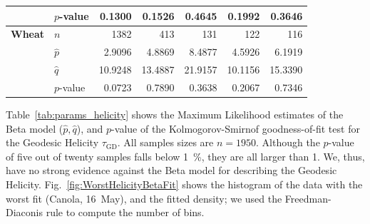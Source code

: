 \documentclass[journal]{IEEEtran}
\begin{document}
\begin{table}[hbt]
\begin{tabular}{clrrrrr}
			& $p$-value 	& 0.1300 	& 0.1526 	& 0.4645 	& 0.1992 	& 0.3646\\
			\midrule
			\textbf{Wheat} 	& $n$ 			& 1382 		& 413 		& 131 		& 122 		& 116\\
			& $\widehat{p}$ & 2.9096  	& 4.8869 	& 8.4877 	& 4.5926 	& 6.1919\\
			& $\widehat{q}$ & 10.9248 	& 13.4887 	& 21.9157 	& 10.1156 	& 15.3390\\
			& $p$-value 	& 0.0723 	& 0.7890 	& 0.3638 	& 0.2067 	& 0.7346\\	
			\bottomrule
		\end{tabular}
	\end{table}
	
	Table~\ref{tab:params_helicity} shows the Maximum Likelihood estimates of the Beta model ($\widehat p,\widehat q$), and $p$-value of the Kolmogorov-Smirnof goodness-of-fit test for the Geodesic Helicity $\tau_{\text{GD}}$.
	All samples sizes are $n=1950$.
	Although the $p$-value of five out of twenty samples falls below \SI{1}{\percent}, they are all larger than \SI{1}{\pertenmille}.
	We, thus, have no strong evidence against the Beta model for describing the Geodesic Helicity.
	Fig.~\ref{fig:WorstHelicityBetaFit} shows the histogram of the data with the worst fit (Canola, 16~May), and the fitted density; we used the Freedman-Diaconis rule to compute the number of bins.
	
\end{document}
